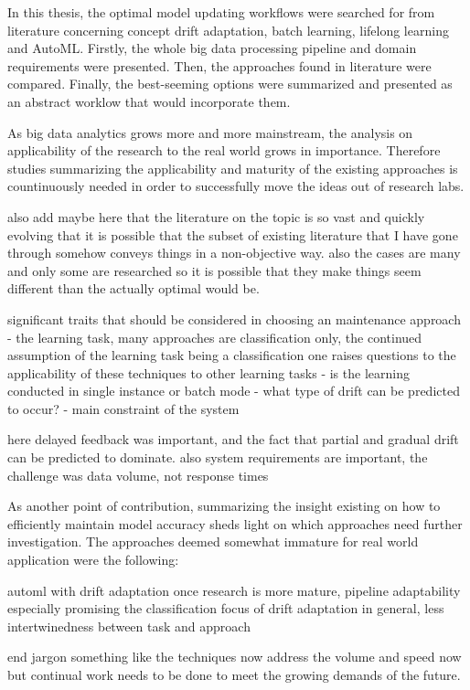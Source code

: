 In this thesis, the optimal model updating workflows were searched for from literature concerning concept drift adaptation, batch learning, lifelong learning and AutoML. Firstly, the whole big data processing pipeline and domain requirements were presented. Then, the approaches found in literature were compared. Finally, the best-seeming options were summarized and presented as an abstract worklow that would incorporate them.

As big data analytics grows more and more mainstream, the analysis on applicability of the research to the real world grows in importance. Therefore studies summarizing the applicability and maturity of the existing approaches is countinuously needed in order to successfully move the ideas out of research labs.


also add maybe here that the literature on the topic is so vast and quickly evolving that it is possible that the subset of existing literature that I have gone through somehow conveys things in a non-objective way. also the cases are many and only some are researched so it is possible that they make things seem different than the actually optimal would be.

significant traits that should be considered in choosing an maintenance approach
 - the learning task, many approaches are classification only, the continued assumption of the learning task being a classification one raises questions to the applicability of these techniques to other learning tasks
 - is the learning conducted in single instance or batch mode
 - what type of drift can be predicted to occur?
 - main constraint of the system
 
 here delayed feedback was important, and the fact that partial and gradual drift can be predicted to dominate. also system requirements are important, the challenge was data volume, not response times
 
 As another point of contribution, summarizing the insight existing on how to efficiently maintain model accuracy sheds light on which approaches need further investigation. The approaches deemed somewhat immature for real world application were the following:
 
 automl with drift adaptation once research is more mature, pipeline adaptability especially promising
 the classification focus of drift adaptation in general, less intertwinedness between task and approach
 
 end jargon something like the techniques now address the volume and speed now but continual work needs to be done to meet the growing demands of the future.
